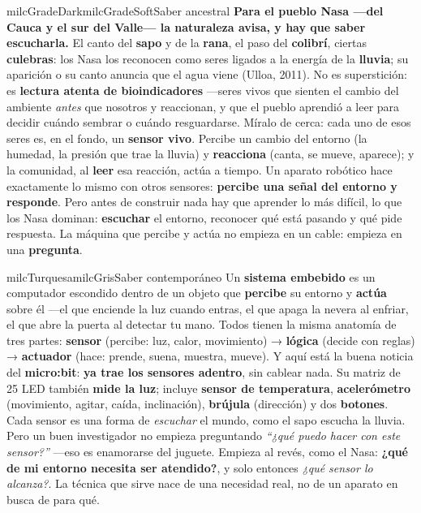 \documentclass[11pt,letterpaper]{article}
\begin{document}
\begin{softbox}{milcGradeDark}{milcGradeSoft}{Saber ancestral}
\textbf{Para el pueblo Nasa ---del Cauca y el sur del Valle--- la naturaleza avisa, y hay que saber escucharla.} El canto del \textbf{sapo} y de la \textbf{rana}, el paso del \textbf{colibrí}, ciertas \textbf{culebras}: los Nasa los reconocen como seres ligados a la energía de la \textbf{lluvia}; su aparición o su canto anuncia que el agua viene (Ulloa, 2011). No es superstición: es \textbf{lectura atenta de bioindicadores} ---seres vivos que sienten el cambio del ambiente \emph{antes} que nosotros y reaccionan, y que el pueblo aprendió a leer para decidir cuándo sembrar o cuándo resguardarse. Míralo de cerca: cada uno de esos seres es, en el fondo, un \textbf{sensor vivo}. Percibe un cambio del entorno (la humedad, la presión que trae la lluvia) y \textbf{reacciona} (canta, se mueve, aparece); y la comunidad, al \textbf{leer} esa reacción, actúa a tiempo. Un aparato robótico hace exactamente lo mismo con otros sensores: \textbf{percibe una señal del entorno y responde}. Pero antes de construir nada hay que aprender lo más difícil, lo que los Nasa dominan: \textbf{escuchar} el entorno, reconocer qué está pasando y qué pide respuesta. La máquina que percibe y actúa no empieza en un cable: empieza en una \textbf{pregunta}.
\end{softbox}

\begin{softbox}{milcTurquesa}{milcGris}{Saber contemporáneo}
Un \textbf{sistema embebido} es un computador escondido dentro de un objeto que \textbf{percibe} su entorno y \textbf{actúa} sobre él ---el que enciende la luz cuando entras, el que apaga la nevera al enfriar, el que abre la puerta al detectar tu mano. Todos tienen la misma anatomía de tres partes: \textbf{sensor} (percibe: luz, calor, movimiento) → \textbf{lógica} (decide con reglas) → \textbf{actuador} (hace: prende, suena, muestra, mueve). Y aquí está la buena noticia del \textbf{micro:bit}: \textbf{ya trae los sensores adentro}, sin cablear nada. Su matriz de 25 LED también \textbf{mide la luz}; incluye \textbf{sensor de temperatura}, \textbf{acelerómetro} (movimiento, agitar, caída, inclinación), \textbf{brújula} (dirección) y dos \textbf{botones}. Cada sensor es una forma de \emph{escuchar} el mundo, como el sapo escucha la lluvia. Pero un buen investigador no empieza preguntando \emph{``¿qué puedo hacer con este sensor?''} ---eso es enamorarse del juguete. Empieza al revés, como el Nasa: \textbf{¿qué de mi entorno necesita ser atendido?}, y solo entonces \emph{¿qué sensor lo alcanza?}. La técnica que sirve nace de una necesidad real, no de un aparato en busca de para qué.
\end{softbox}
\end{document}
